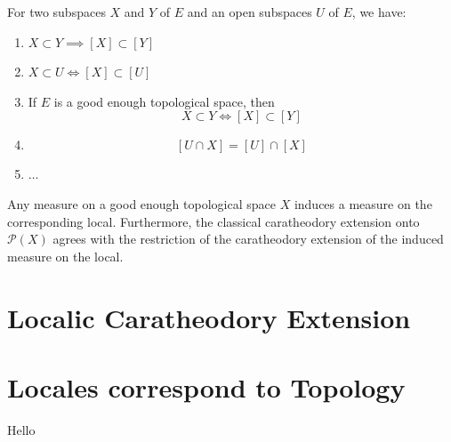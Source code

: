 \begin{proposition}
    \label{prop:subset_to_sublocal_structure}
    For two subspaces $X$ and $Y$ of $E$ and an open subspaces $U$ of $E$, we have:
    \begin{enumerate}
        \item $X \subset Y \implies [X] \subset [Y]$
        \item $X \subset U \iff [X] \subset [U]$
        \item If $E$ is a good enough topological space, then \[X \subset Y \iff [X] \subset [Y]\]
        \item \[[U \cap X] = [U] \cap [X]\]
        \item $\dots$
    \end{enumerate}

\end{proposition}

\begin{theorem}
    \label{thm:measure_top_to_loc}
    Any measure on a good enough topological space $X$ induces a measure on the corresponding local. Furthermore, the classical caratheodory extension onto $\mathcal{P}(X)$ agrees with the restriction of the caratheodory extension of the induced measure on the local.
\end{theorem}





%

\chapter{Localic Caratheodory Extension}


\chapter{Locales correspond to Topology}

Hello
